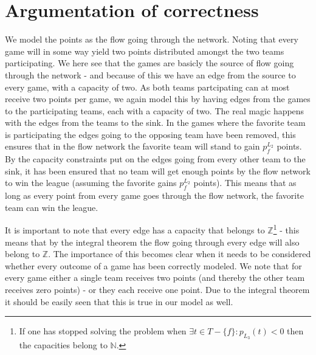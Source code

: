 \documentclass{report}
\begin{document}
	\section*{Argumentation of correctness}
	We model the points as the flow going through the network. Noting that every game will in some way yield two points distributed amongst the two teams participating. We here see that the games are basicly the source of flow going through the network - and because of this we have an edge from the source to every game, with a capacity of two. As both teams partcipating can at most receive two points per game, we again model this by having edges from the games to the participating teams, each with a capacity of two. The real magic happens with the edges from the teams to the sink. In the games where the favorite team is participating the edges going to the opposing team have been removed, this ensures that in the flow network the favorite team will stand to gain $p_f^{L_2}$ points. By the capacity constraints put on the edges going from every other team to the sink, it has been ensured that no team will get enough points by the flow network to win the league (assuming the favorite gains $p_f^{L_2}$ points). This means that as long as every point from every game goes through the flow network, the favorite team can win the league.

	It is important to note that every edge has a capacity that belongs to $\mathbb{Z}$\footnote{If one has stopped solving the problem when $\exists t \in T-\{f\} : p_{L_3}(t) < 0$ then the capacities belong to $\mathbb{N}$.} - this means that by the integral theorem the flow going through every edge will also belong to $\mathbb{Z}$. The importance of this becomes clear when it needs to be considered whether every outcome of a game has been correctly modeled. We note that for every game either a single team receives two points (and thereby the other team receives zero points) - or they each receive one point. Due to the integral theorem it should be easily seen that this is true in our model as well.
\end{document}

